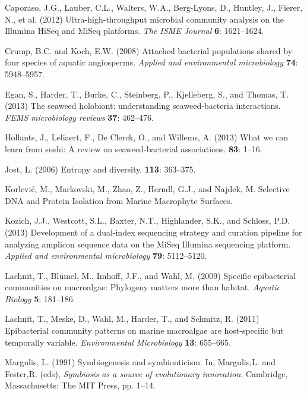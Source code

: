 \documentclass[12pt,]{article}
\begin{document}
\leavevmode\hypertarget{ref-Caporaso2012}{}%
Caporaso, J.G., Lauber, C.L., Walters, W.A., Berg-Lyons, D., Huntley,
J., Fierer, N., et al. (2012) Ultra-high-throughput microbial community
analysis on the Illumina HiSeq and MiSeq platforms. \emph{The ISME
Journal} \textbf{6}: 1621--1624.

\leavevmode\hypertarget{ref-Crump2008}{}%
Crump, B.C. and Koch, E.W. (2008) Attached bacterial populations shared
by four species of aquatic angiosperms. \emph{Applied and environmental
microbiology} \textbf{74}: 5948--5957.

\leavevmode\hypertarget{ref-Egan2013}{}%
Egan, S., Harder, T., Burke, C., Steinberg, P., Kjelleberg, S., and
Thomas, T. (2013) The seaweed holobiont: understanding seaweed-bacteria
interactions. \emph{FEMS microbiology reviews} \textbf{37}: 462--476.

\leavevmode\hypertarget{ref-Hollants2013}{}%
Hollants, J., Leliaert, F., De Clerck, O., and Willems, A. (2013) What
we can learn from sushi: A review on seaweed-bacterial associations.
\textbf{83}: 1--16.

\leavevmode\hypertarget{ref-Jost2006}{}%
Jost, L. (2006) Entropy and diversity. \textbf{113}: 363--375.

\leavevmode\hypertarget{ref-Korlevic_in_press}{}%
Korlević, M., Markovski, M., Zhao, Z., Herndl, G.J., and Najdek, M.
Selective DNA and Protein Isolation from Marine Macrophyte Surfaces.

\leavevmode\hypertarget{ref-Kozich2013}{}%
Kozich, J.J., Westcott, S.L., Baxter, N.T., Highlander, S.K., and
Schloss, P.D. (2013) Development of a dual-index sequencing strategy and
curation pipeline for analyzing amplicon sequence data on the MiSeq
Illumina sequencing platform. \emph{Applied and environmental
microbiology} \textbf{79}: 5112--5120.

\leavevmode\hypertarget{ref-Lachnit2009}{}%
Lachnit, T., Blümel, M., Imhoff, J.F., and Wahl, M. (2009) Specific
epibacterial communities on macroalgae: Phylogeny matters more than
habitat. \emph{Aquatic Biology} \textbf{5}: 181--186.

\leavevmode\hypertarget{ref-Lachnit2011}{}%
Lachnit, T., Meske, D., Wahl, M., Harder, T., and Schmitz, R. (2011)
Epibacterial community patterns on marine macroalgae are host-specific
but temporally variable. \emph{Environmental Microbiology} \textbf{13}:
655--665.

\leavevmode\hypertarget{ref-Margulis1991}{}%
Margulis, L. (1991) Symbiogenesis and symbionticism. In, Margulis,L. and
Fester,R. (eds), \emph{Symbiosis as a source of evolutionary
innovation}. Cambridge, Massachusetts: The MIT Press, pp. 1--14.
\end{document}
